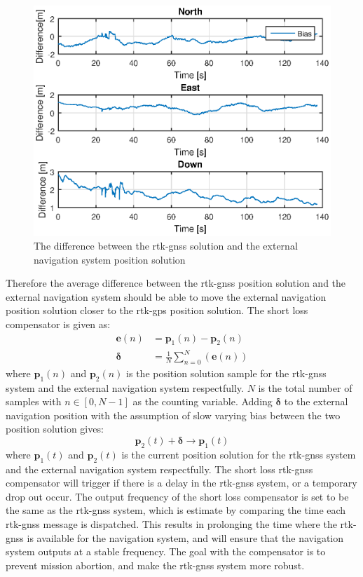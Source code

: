 \begin{figure}[H]
\centering
\includegraphics[scale=0.8]{figs/Experiment/biasShow.eps}
\caption{The difference between the \gls{rtk-gnss} solution and the external navigation system position solution}
\label{Fig:RtkExtDiff}
\end{figure}
Therefore the average difference between the \gls{rtk-gnss} position solution and the external navigation system should be able to move the external navigation position solution closer to the \gls{rtk-gps} position solution. The short loss compensator is given as:
\begin{align}
\mathbf{e}(n) &= \mathbf{p}_1(n) - \mathbf{p}_2(n)\\
\mathbf{\delta} &= \frac{1}{N}\sum_{n=0}^N(\mathbf{e}(n))
\end{align}
where $\mathbf{p}_1(n)$ and $\mathbf{p}_2(n)$ is the position solution sample for the \gls{rtk-gnss} system and the external navigation system respectfully. $N$ is the total number of samples with $n\in [0,N-1]$ as the counting variable. Adding $\mathbf{\delta}$ to the external navigation position with the assumption of slow varying bias between the two position solution gives:
\begin{equation}
\mathbf{p}_2(t) + \mathbf{\delta} \rightarrow \mathbf{p}_1(t)
\end{equation}
where $\mathbf{p}_1(t)$ and $\mathbf{p}_2(t)$ is the current position solution for the \gls{rtk-gnss} system and the external navigation system respectfully. The short loss \gls{rtk-gnss} compensator will trigger if there is a delay in the \gls{rtk-gnss} system, or a temporary drop out occur. The output frequency of the short loss compensator is set to be the same as the \gls{rtk-gnss} system, which is estimate by comparing the time each \gls{rtk-gnss} message is dispatched. This results in prolonging the time where the \gls{rtk-gnss} is available for the navigation system, and will ensure that the navigation system outputs at a stable frequency. The goal with the compensator is to prevent mission abortion, and make the \gls{rtk-gnss} system more robust.

